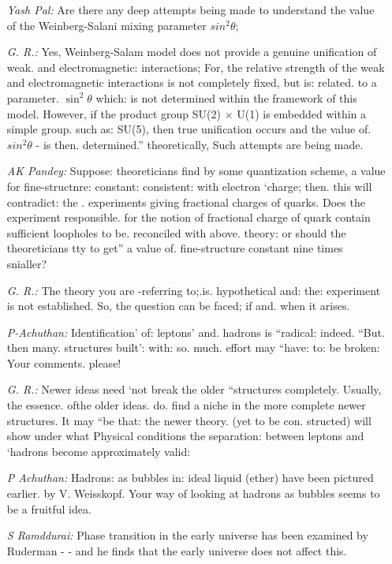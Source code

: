 \begin{enumerate}
\item[{\it Yash Pal:}] Are there any deep attempts being made to understand the value of the
Weinberg-Salani mixing parameter $sin^{2}\theta$; 

\item[{\it G. R.:}] Yes, Weinberg-Salam model does not provide a genuine unification of
weak. and electromagnetic: interactions; For, the relative strength of the
weak and electromagnetic interactions is not completely fixed, but is:
related. to a parameter. $\sin^{2}\theta$ which: is not determined within the framework of this model. However, if the product group SU(2) $\times$ U(1) is
embedded within a simple group. such as: SU(5), then true unification
occurs and the value of. $sin^{2}\theta$ - is then. determined.” theoretically, Such
attempts are being made. 
\item[{\it AK Pandey:}] Suppose: theoreticians find by some quantization scheme, a value for
fine-structnre: constant: consistent: with electron ‘charge; then. this will
contradict: the . experiments giving fractional charges of quarks. Does
the experiment responsible. for the notion of fractional charge of quark
contain sufficient loopholes to be. reconciled with above. theory: or
should the theoreticians tty to get” a value of. fine-structure constant
nine times snialler? 
\item[{\it G. R.:}] The theory you are -referring to;.is. hypothetical and: the: experiment
is not established. So, the question can be faced; if and. when it arises. 

\item[{\it P-Achuthan:}] Identification’ of: leptons’ and. hadrons is “radical: indeed. “But. then
many. structures built’: with: so. much. effort may “have: to: be broken:
Your comments. please! 

\item[{\it G. R.:}] Newer ideas need ‘not break the older “structures completely. Usually,
the essence. ofthe older ideas. do. find a niche in the more complete
newer structures. It may “be that: the newer theory. (yet to be con.
structed) will show under what Physical conditions the separation:
between leptons and ‘hadrons become approximately valid: 

\item[{\it P Achuthan:}] Hadrons: as bubbles in: ideal liquid (ether) have been pictured earlier. by
V. Weisskopf. Your way of looking at hadrons as bubbles seems to be
a fruitful idea. 

\item[{\it S Ramddurai: }] Phase transition in the early universe has been examined by Ruderman - -
and he finds that the early universe does not affect this. 
  \end{enumerate}

